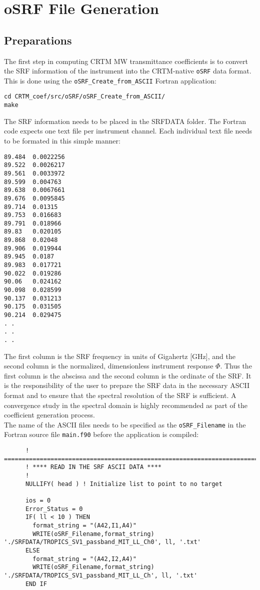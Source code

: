 \section{oSRF File Generation}

\subsection{Preparations}
The first step in computing CRTM MW transmittance coefficients is to convert the SRF information of the instrument into the CRTM-native \verb|oSRF| data format.
This is done using the \verb|oSRF_Create_from_ASCII| Fortran application:
\begin{verbatim}
cd CRTM_coef/src/oSRF/oSRF_Create_from_ASCII/
make 
\end{verbatim}
The SRF information needs to be placed in the SRFDATA folder. The Fortran code expects one text file per instrument channel.
Each individual text file needs to be formated in this simple manner:
\begin{verbatim}
89.484	0.0022256
89.522	0.0026217
89.561	0.0033972
89.599	0.004763
89.638	0.0067661
89.676	0.0095845
89.714	0.01315
89.753	0.016683
89.791	0.018966
89.83	0.020105
89.868	0.02048
89.906	0.019944
89.945	0.0187
89.983	0.017721
90.022	0.019286
90.06	0.024162
90.098	0.028599
90.137	0.031213
90.175	0.031505
90.214	0.029475
. .
. .
. .
\end{verbatim}
The first column is the SRF frequency in units of Gigahertz [GHz], and the second column is the normalized, dimensionless instrument response $\Phi$.
Thus the first column is the abscissa and the second column is the ordinate of the SRF.
It is the responsibility of the user to prepare the SRF data in the necessary ASCII format and to ensure that the spectral resolution of the SRF is sufficient. 
A convergence study in the spectral domain is highly recommended as part of the coefficient generation process.\\

The name of the ASCII files needs to be specified as the \verb|oSRF_Filename| in the Fortran source file \verb|main.f90| before the application is compiled:
\begin{verbatim}
      ! ============================================================================
      ! **** READ IN THE SRF ASCII DATA ****
      !  
      NULLIFY( head ) ! Initialize list to point to no target

      ios = 0
      Error_Status = 0
      IF( ll < 10 ) THEN
        format_string = "(A42,I1,A4)"
        WRITE(oSRF_Filename,format_string) './SRFDATA/TROPICS_SV1_passband_MIT_LL_Ch0', ll, '.txt'
      ELSE
        format_string = "(A42,I2,A4)"
        WRITE(oSRF_Filename,format_string) './SRFDATA/TROPICS_SV1_passband_MIT_LL_Ch', ll, '.txt'
      END IF
\end{verbatim}

